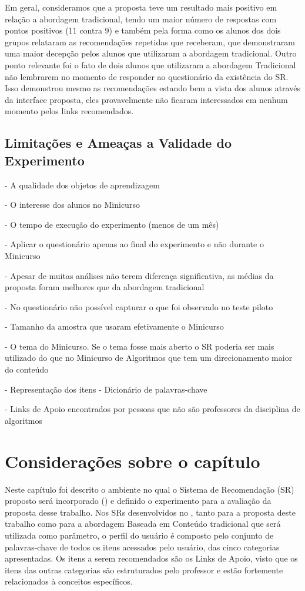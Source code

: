 Em geral, consideramos que a proposta teve um resultado mais positivo em relação a abordagem tradicional, tendo um maior
número de respostas com pontos positivos (11 contra 9) e também pela forma como os alunos dos dois grupos relataram
as recomendações repetidas que receberam, que demonstraram uma maior decepção pelos alunos que utilizaram a abordagem
tradicional. Outro ponto relevante foi o fato de dois alunos que utilizaram a abordagem Tradicional não lembrarem no momento
de responder ao questionário da existência do SR. Isso demonstrou mesmo as recomendações estando bem a vista dos alunos
através da interface proposta, eles provavelmente não ficaram interessados em nenhum momento pelos links recomendados.

\subsection{Limitações e Ameaças a Validade do Experimento}\label{subsection:ameacas-a-validade}

- A qualidade dos objetos de aprendizagem

- O interesse dos alunos no Minicurso

- O tempo de execução do experimento (menos de um mês)

- Aplicar o questionário apenas ao final do experimento e não durante o Minicurso

- Apesar de muitas análises não terem diferença significativa, as médias da proposta foram melhores que da abordagem tradicional

- No questionário não possível capturar o que foi observado no teste piloto

- Tamanho da amostra que usaram efetivamente o Minicurso

- O tema do Minicurso. Se o tema fosse mais aberto o SR poderia ser mais utilizado do que no Minicurso de Algoritmos
que tem um direcionamento maior do conteúdo

- Representação dos itens - Dicionário de palavras-chave

- Links de Apoio encontrados por pessoas que não são professores da disciplina de algoritmos

\section{Considerações sobre o capítulo}

Neste capítulo foi descrito o ambiente no qual o Sistema de Recomendação (SR) proposto será incorporado (\adaptweb) e definido o
experimento para a avaliação da proposta desse trabalho. Nos SRs desenvolvidos no \adaptweb, tanto para a proposta deste trabalho como para a abordagem
Baseada em Conteúdo tradicional que será utilizada como parâmetro, o perfil do usuário é composto pelo conjunto de palavras-chave de todos os itens acessados pelo usuário, das
cinco categorias apresentadas. Os itens a serem recomendados são os Links de Apoio, visto que os itens das outras categorias
são estruturados pelo professor e estão fortemente relacionados à conceitos específicos.

